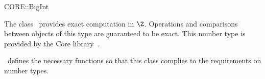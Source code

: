 \ccDefGlobalScope{}
\begin{ccRefClass}{CORE::BigInt}

\ccDefinition

The class \ccRefName\ provides exact computation in $\Z$.
Operations and comparisons between objects of this type are guaranteed to be exact.  
This number type is provided by the {\sc Core} library~\cite{klpy-clp-99}.

\cgal\ defines the necessary functions so that this class complies to the
requirements on number types.


\ccIsModel
{}\\
\\

\end{ccRefClass}
